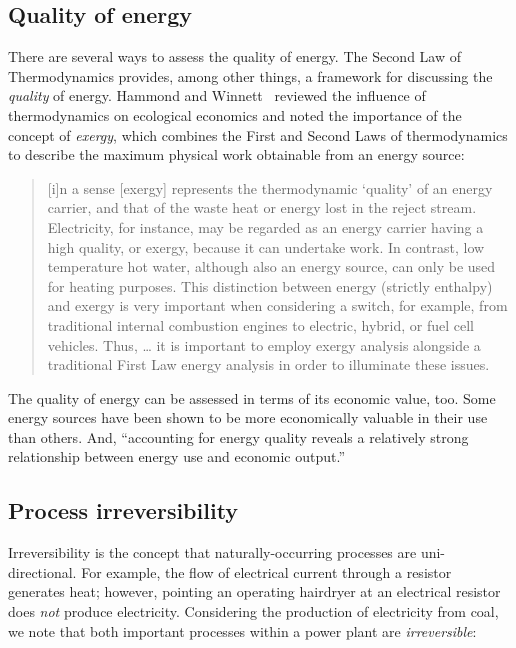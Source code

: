 \subsection{Quality of energy}
\label{sec:energy_quality}

There are several ways to assess the quality of energy.
The Second Law of Thermodynamics provides, among other things,
a framework for discussing the \emph{quality} of energy.
Hammond and Winnett~\cite{Hammond:2009tu} reviewed
the influence of thermodynamics on ecological economics 
and noted the importance of the concept of \emph{exergy},
which combines the First and Second Laws of thermodynamics
to describe the maximum physical work obtainable from an energy source:

\begin{quote}
	[i]n a sense [exergy] represents the thermodynamic `quality' 
	of an energy carrier, 
	and that of the waste heat or energy lost in the reject stream. 
	Electricity, for instance, may be regarded as an energy carrier having a high quality, 
	or exergy, because it can undertake work. 
	In contrast, low temperature hot water, although also an energy source, 
	can only be used for heating purposes. 
	This distinction between energy (strictly enthalpy) and exergy is very important 
	when considering a switch, for example, 
	from traditional internal combustion engines to electric, hybrid, or fuel cell vehicles. 
	Thus, \ldots{} it is important to employ exergy analysis 
	alongside a traditional First Law energy analysis in order to illuminate these issues.
\end{quote}

The quality of energy can be assessed in terms of its economic value, too.
Some energy sources have been shown to be more economically valuable in their use
than others.
And, ``accounting for energy quality reveals a relatively strong relationship 
between energy use and economic output.''~\cite[p. 313]{Cleveland2000}


\subsection{Process irreversibility}
\label{sec:irreversibility}

Irreversibility is the concept that naturally-occurring processes 
are uni-directional.
For example, the flow of electrical current through a resistor
generates heat;
however, pointing an operating hairdryer at an electrical resistor 
does \emph{not} produce electricity.
Considering the production of electricity from coal,
we note that both important processes within a power plant are \emph{irreversible}:


